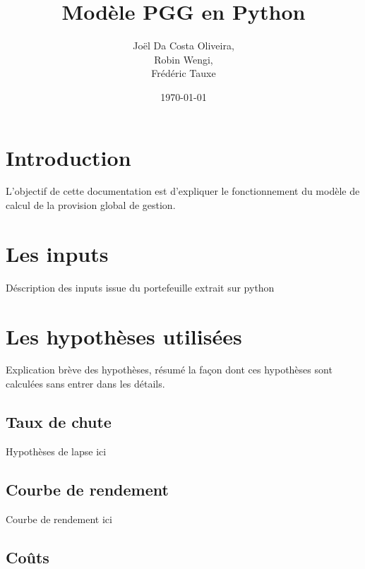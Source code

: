 \documentclass{article}
\begin{document}
\title{Modèle PGG en Python}
\author{Joël Da Costa Oliveira,\\
   Robin Wengi,\\
   Frédéric Tauxe\\}
\date{\today}

\maketitle



\newpage
\tableofcontents
\newpage

\section{Introduction}

L'objectif de cette documentation est d'expliquer le fonctionnement du modèle de calcul de la provision global de gestion.

\newpage

\section{Les inputs}

Déscription des inputs issue du portefeuille extrait sur python

\newpage

\section{Les hypothèses utilisées}

Explication brève des hypothèses, résumé la façon dont ces hypothèses sont calculées sans entrer dans les détails.

\subsection{Taux de chute}

Hypothèses de lapse ici

\subsection{Courbe de rendement}

Courbe de rendement ici

\subsection{Coûts}
\end{document}
